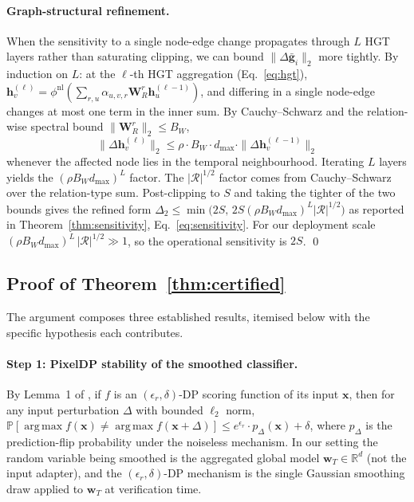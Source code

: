 \documentclass[11pt]{article}
\theoremstyle{plain}
\theoremstyle{definition}
\theoremstyle{remark}
\newcommand{\R}{\mathbb{R}}
\providecommand{\Prob}{}\renewcommand{\Prob}{\mathbb{P}}
\newcommand{\Rcal}{\mathcal{R}}
\newcommand{\norm}[1]{\|#1\|}
\DeclareMathOperator*{\argmax}{arg\,max}
\begin{document}
\paragraph{Graph-structural refinement.}
When the sensitivity to a single node-edge change propagates through
$L$ HGT layers rather than saturating clipping, we can bound
$\norm{\Delta \bar{\mathbf{g}}_i}_2$ more tightly. By induction on
$L$: at the $\ell$-th HGT aggregation (Eq.~\ref{eq:hgt}),
$\mathbf{h}_v^{(\ell)} = \phi^{\mathrm{nl}}(\sum_{r,u} \alpha_{u,v,r}
\mathbf{W}_R^r \mathbf{h}_u^{(\ell-1)})$, and differing in a
single node-edge changes at most one term in the inner sum. By
Cauchy--Schwarz and the relation-wise spectral bound
$\norm{\mathbf{W}_R^r}_2 \le B_W$,
\begin{equation}
\norm{\Delta \mathbf{h}_v^{(\ell)}}_2 \le \rho \cdot B_W \cdot d_{\max} \cdot \norm{\Delta \mathbf{h}_v^{(\ell-1)}}_2
\end{equation}
whenever the affected node lies in the temporal neighbourhood.
Iterating $L$ layers yields the $(\rho B_W d_{\max})^L$ factor.
The $|\Rcal|^{1/2}$ factor comes from Cauchy--Schwarz over the
relation-type sum. Post-clipping to $S$ and taking the tighter of the two bounds
gives the refined form
$\Delta_2\le\min\!\bigl(2S,\,2S(\rho B_W d_{\max})^L |\Rcal|^{1/2}\bigr)$
as reported in Theorem~\ref{thm:sensitivity},
Eq.~\eqref{eq:sensitivity}.
For our deployment scale
$(\rho B_W d_{\max})^L\,|\Rcal|^{1/2}\gg 1$, so the operational
sensitivity is $2S$.
\qed

\subsection{Proof of Theorem~\ref{thm:certified}}

The argument composes three established results, itemised below
with the specific hypothesis each contributes.

\paragraph{Step 1: PixelDP stability of the smoothed classifier.}
By Lemma~1 of \citet{lecuyer2019certified}, if $f$ is an
$(\epsilon_r,\delta)$-DP scoring function of its input
$\mathbf{x}$, then for any input perturbation $\Delta$ with
bounded $\ell_2$ norm,
$\Prob[\argmax f(\mathbf{x}) \neq \argmax f(\mathbf{x} +
\Delta)] \leq e^{\epsilon_r} \cdot p_{\Delta}(\mathbf{x}) + \delta$,
where $p_{\Delta}$ is the prediction-flip probability under the
noiseless mechanism. In our setting the random variable being
smoothed is the aggregated global model $\mathbf{w}_T\in\R^d$
(not the input adapter), and the $(\epsilon_r,\delta)$-DP mechanism
is the single Gaussian smoothing draw applied to $\mathbf{w}_T$ at
verification time.
\end{document}
